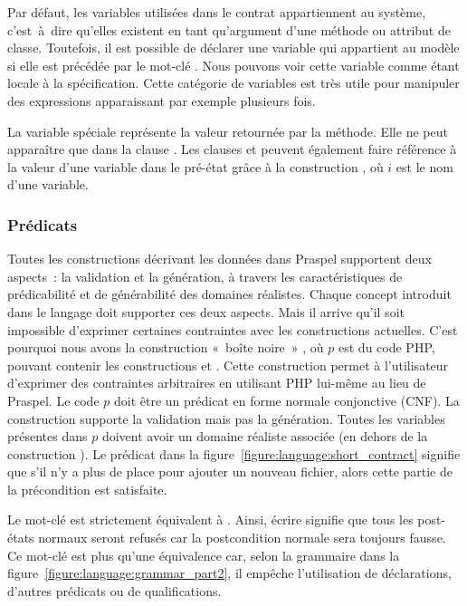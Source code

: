 Par défaut, les variables utilisées dans le contrat appartiennent au système,
c'est~à~di\-re qu'elles existent en tant qu'argument d'une méthode ou attribut
de classe. Toutefois, il est possible de déclarer une variable qui appartient au
modèle si elle est précédée par le mot-clé . Nous pouvons voir cette
variable comme étant locale à la spécification. Cette catégorie de variables est
très utile pour manipuler des expressions apparaissant par exemple plusieurs
fois.

La variable spéciale \aresult représente la valeur {\strong retournée} par la
méthode. Elle ne peut apparaître que dans la clause \aensures. Les clauses
\aensures et \athrowable peuvent également faire référence à la valeur d'une
variable dans le pré-état grâce à la construction , où $i$ est le nom
d'une variable.

\subsubsection{Prédicats}

Toutes les constructions décrivant les données dans Praspel supportent deux
aspects~: la validation et la génération, à travers les caractéristiques de
prédicabilité et de générabilité des domaines réalistes. Chaque concept
introduit dans le langage doit supporter ces deux aspects. Mais il arrive qu'il
soit impossible d'exprimer certaines contraintes avec les constructions
actuelles. C'est pourquoi nous avons la construction «~boîte noire~» ,
où $p$ est du code PHP, pouvant contenir les constructions \aresult et .
Cette construction  permet à l'utilisateur d'exprimer des contraintes
arbitraires en utilisant PHP lui-même au lieu de Praspel. Le code $p$ doit être
un prédicat en forme normale {\strong conjonctive} (CNF). La construction
 supporte la validation mais pas la génération. Toutes les variables
présentes dans $p$ doivent avoir un domaine réaliste associée (en dehors de la
construction ). Le prédicat  dans la figure~\ref{figure:language:short_contract} signifie
que s'il n'y a plus de place pour ajouter un nouveau fichier, alors cette partie
de la précondition est satisfaite.

Le mot-clé \anone est strictement équivalent à . Ainsi,
écrire \code{\aensures \anone;} signifie que tous les post-états normaux seront
refusés car la postcondition normale sera toujours fausse. Ce mot-clé est plus
qu'une équivalence car, selon la grammaire dans la
figure~\ref{figure:language:grammar_part2}, il empêche l'utilisation de
déclarations, d'autres prédicats ou de qualifications.

